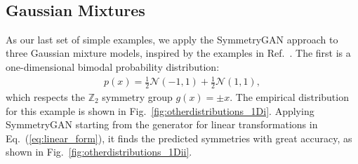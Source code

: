 \documentclass[aps,prx,reprint,preprintnumbers,superscriptaddress,nofootinbib,longbibliography,floatfix]{revtex4-1}
\newcommand{\Z}{\mathbb{Z}}
\DeclareRobustCommand{\Fig}[1]{Fig.~\ref{fig:#1}}
\DeclareRobustCommand{\Eq}[1]{Eq.~(\ref{eq:#1})}
\DeclareRobustCommand{\Ref}[1]{Ref.~\cite{#1}}
\begin{document}
\begin{figure*}
    \\
    \caption{
    Empirical distributions (left column) and empirically discovered rotations (middle column) and reflections (right column) overlaid on the analytic loss landscape for two two-dimensional Gaussian mixture models inspired by \Ref{fisher2018boltzmann}.
    The studied examples are (i,ii,iii) a two-dimensional octagonal distribution, and (iv,v,vi) a two-dimensional 5$\times$5 distribution. Note that antipodal points on (iii) and (vi) represent the same reflection}
    \label{fig:otherdistributions_2D}
\end{figure*}


\subsection{Gaussian Mixtures}


As our last set of simple examples, we apply the SymmetryGAN approach to three Gaussian mixture models, inspired by the examples in \Ref{fisher2018boltzmann}.
%
The first is a one-dimensional bimodal probability distribution:
%
\begin{align}
p(x) = \frac12\mathcal N (-1, 1) + \frac12 \mathcal N (1, 1),
\end{align}
%
which respects the $\Z_2$ symmetry group $g(x) = \pm x$.
%
The empirical distribution for this example is shown in \Fig{otherdistributions_1Di}.
%
Applying SymmetryGAN starting from the generator for linear transformations in \Eq{linear_form}, it finds the predicted symmetries with great accuracy, as shown in \Fig{otherdistributions_1Dii}.
\end{document}
